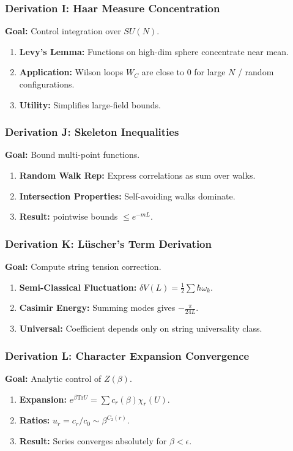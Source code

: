 \subsubsection{Derivation I: Haar Measure Concentration}
\textbf{Goal:} Control integration over $SU(N)$.
\begin{enumerate}
    \item \textbf{Levy's Lemma:} Functions on high-dim sphere concentrate near mean.
    \item \textbf{Application:} Wilson loops $W_C$ are close to 0 for large $N$ / random configurations.
    \item \textbf{Utility:} Simplifies large-field bounds.
\end{enumerate}

\subsubsection{Derivation J: Skeleton Inequalities}
\textbf{Goal:} Bound multi-point functions.
\begin{enumerate}
    \item \textbf{Random Walk Rep:} Express correlations as sum over walks.
    \item \textbf{Intersection Properties:} Self-avoiding walks dominate.
    \item \textbf{Result:} pointwise bounds $\le e^{-m L}$.
\end{enumerate}

\subsubsection{Derivation K: Lüscher's Term Derivation}
\textbf{Goal:} Compute string tension correction.
\begin{enumerate}
    \item \textbf{Semi-Classical Fluctuation:} $\delta V(L) = \frac{1}{2} \sum \hbar \omega_k$.
    \item \textbf{Casimir Energy:} Summing modes gives $-\frac{\pi}{24 L}$.
    \item \textbf{Universal:} Coefficient depends only on string universality class.
\end{enumerate}

\subsubsection{Derivation L: Character Expansion Convergence}
\textbf{Goal:} Analytic control of $Z(\beta)$.
\begin{enumerate}
    \item \textbf{Expansion:} $e^{\beta \text{Tr} U} = \sum c_r(\beta) \chi_r(U)$.
    \item \textbf{Ratios:} $u_r = c_r / c_0 \sim \beta^{C_2(r)}$.
    \item \textbf{Result:} Series converges absolutely for $\beta < \epsilon$.
\end{enumerate}

